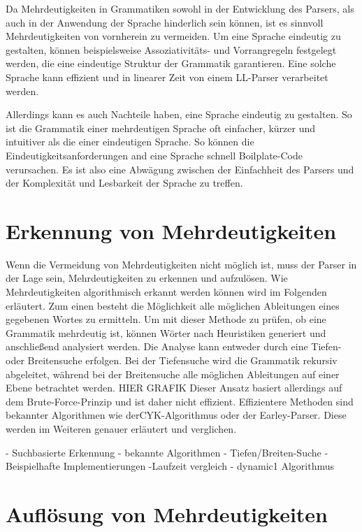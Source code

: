 \documentclass[runningheads]{llncs}
\begin{document}
	Da Mehrdeutigkeiten in Grammatiken sowohl in der Entwicklung des Parsers,
	als auch in der Anwendung der Sprache hinderlich sein können,
	ist es sinnvoll Mehrdeutigkeiten von vornherein zu vermeiden.
	Um eine Sprache eindeutig zu gestalten,
	können beispielsweise Assoziativitäts- und Vorrangregeln festgelegt werden,
	die eine eindeutige Struktur der Grammatik garantieren. \cite{wharton1976}
	Eine solche Sprache kann effizient und in linearer Zeit von einem LL-Parser verarbeitet werden.

	Allerdings kann es auch Nachteile haben, eine Sprache eindeutig zu gestalten.
	So ist die Grammatik einer mehrdeutigen Sprache oft einfacher, kürzer und intuitiver als die einer eindeutigen Sprache.
	So können die Eindeutigkeitsanforderungen and eine Sprache schnell Boilplate-Code verursachen.
	Es ist also eine Abwägung zwischen der Einfachheit des Parsers und der Komplexität und Lesbarkeit der Sprache zu treffen.


	\section{Erkennung von Mehrdeutigkeiten}

	Wenn die Vermeidung von Mehrdeutigkeiten nicht möglich ist,
	muss der Parser in der Lage sein, Mehrdeutigkeiten zu erkennen und aufzulösen.
	Wie Mehrdeutigkeiten algorithmisch erkannt werden können wird im Folgenden erläutert.
	Zum einen besteht die Möglichkeit alle möglichen Ableitungen eines gegebenen Wortes zu ermitteln.
	Um mit dieser Methode zu prüfen, ob eine Grammatik mehrdeutig ist,
	können Wörter nach Heuristiken generiert und anschließend analysiert werden.
	Die Analyse kann entweder durch eine Tiefen- oder Breitensuche erfolgen.
	Bei der Tiefensuche wird die Grammatik rekursiv abgeleitet,
	während bei der Breitensuche alle möglichen Ableitungen auf einer Ebene betrachtet werden.
	HIER GRAFIK
	Dieser Ansatz basiert allerdings auf dem Brute-Force-Prinzip und ist daher nicht effizient.
	Effizientere Methoden sind bekannter Algorithmen wie derCYK-Algorithmus oder der Earley-Parser.
	Diese werden im Weiteren genauer erläutert und verglichen.

	- Suchbasierte Erkennung
	- bekannte Algorithmen
	- Tiefen/Breiten-Suche
	- Beispielhafte Implementierungen
	-Laufzeit vergleich
	- dynamic1 Algorithmus


	\section{Auflösung von Mehrdeutigkeiten}
\end{document}
